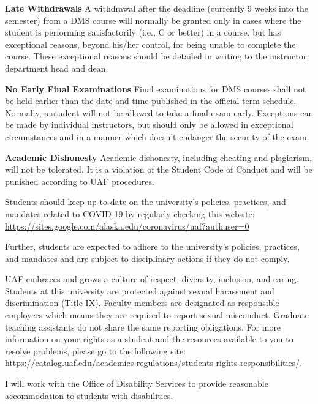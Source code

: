 \documentclass[11pt]{article}
\begin{document}
\textbf{Late Withdrawals} 
A withdrawal after the deadline (currently 9 weeks into the semester) from a DMS course will normally be granted only in cases where the student is performing satisfactorily (i.e., C or better) in a course, but has exceptional reasons, beyond his/her control, for being unable to complete the course. These exceptional reasons should be detailed in writing to the instructor, department head and dean.

\textbf{No Early Final Examinations}
Final examinations for DMS
  courses shall not be held earlier than the date and time published
  in the official term schedule. Normally, a student will not be
  allowed to take a final exam early. Exceptions can be made by
  individual instructors, but should only be allowed in exceptional
  circumstances and in a manner which doesn't endanger the security of
  the exam.

\textbf{Academic Dishonesty}
Academic dishonesty, including cheating and plagiarism, will not
be tolerated.  It is a violation of the Student Code of Conduct
and will be punished according to UAF procedures.

 
  Students should keep up-to-date on the university's policies, practices, and mandates related to COVID-19 by regularly checking this website: \url{https://sites.google.com/alaska.edu/coronavirus/uaf?authuser=0}

Further, students are expected to adhere to the university's policies, practices, and mandates and are subject to disciplinary actions if they do not comply.

 UAF embraces and grows a culture of respect, diversity, inclusion, and caring. Students at this university are protected against sexual harassment and discrimination (Title IX). Faculty members are designated as responsible employees which means they are required to report sexual misconduct. Graduate teaching assistants do not share the same reporting obligations. For more information on your rights as a student and the resources available to you to resolve problems, please go to the following site: \url{https://catalog.uaf.edu/academics-regulations/students-rights-responsibilities/}.

 I will work with the Office of Disability Services to provide reasonable accommodation to students with disabilities.
\end{document}
